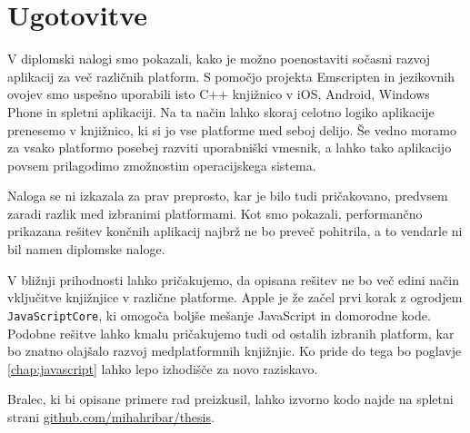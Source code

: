 








\chapter{Ugotovitve}
\label{chap:conclusion}

V diplomski nalogi smo pokazali, kako je možno poenostaviti sočasni razvoj aplikacij za več različnih platform. S pomočjo projekta Emscripten in jezikovnih ovojev smo uspešno uporabili isto C++ knjižnico v iOS, Android, Windows Phone in spletni aplikaciji. Na ta način lahko skoraj celotno logiko aplikacije prenesemo v knjižnico, ki si jo vse platforme med seboj delijo. Še vedno moramo za vsako platformo posebej razviti uporabniški vmesnik, a lahko tako aplikacijo povsem prilagodimo zmožnostim operacijskega sistema.

Naloga se ni izkazala za prav preprosto, kar je bilo tudi pričakovano, predvsem zaradi razlik med izbranimi platformami. Kot smo pokazali, performančno prikazana rešitev končnih aplikacij najbrž ne bo preveč pohitrila, a to vendarle ni bil namen diplomske naloge.

V bližnji prihodnosti lahko pričakujemo, da opisana rešitev ne bo več edini način vključitve knjižnjice v različne platforme. Apple je že začel prvi korak z ogrodjem \texttt{JavaScriptCore}, ki omogoča boljše mešanje JavaScript in domorodne kode. Podobne rešitve lahko kmalu pričakujemo tudi od ostalih izbranih platform, kar bo znatno olajšalo razvoj medplatformnih knjižnjic. Ko pride do tega bo poglavje \ref{chap:javascript} lahko lepo izhodišče za novo raziskavo.

Bralec, ki bi opisane primere rad preizkusil, lahko izvorno kodo najde na spletni strani \href{https://github.com/mihahribar/thesis}{github.com/mihahribar/thesis}.
